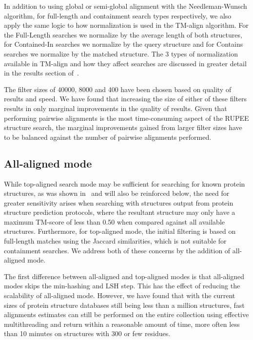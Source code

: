 \documentclass[10pt,letterpaper]{article}
\begin{document}
In addition to using global or semi-global alignment with the Needleman-Wunsch algorithm, for full-length and containment search types respectively, we also apply the same logic to how normalization is used in the TM-align algorithm. 
For the Full-Length searches we normalize by the average length of both structures, for Contained-In searches we normalize by the query structure and for Contains searches we normalize by the matched structure.
The 3 types of normalization available in TM-align and how they affect searches are discussed in greater detail in the results section of~\cite{Ayoub2019}.

The filter sizes of 40000, 8000 and 400 have been chosen based on quality of results and speed. 
We have found that increasing the size of either of these filters results in only marginal improvements in the quality of results. 
Given that performing pairwise alignments is the most time-consuming aspect of the RUPEE structure search, the marginal improvements gained from larger filter sizes have to be balanced against the number of pairwise alignments performed. 

\subsection*{All-aligned mode}

While top-aligned search mode may be sufficient for searching for known protein structures, as was shown in~\cite{Ayoub2019} and will also be reinforced below, the need for greater sensitivity arises when searching with structures output from protein structure prediction protocols, where the resultant structure may only have a maximum TM-score of less than 0.50 when compared against all available structures.
Furthermore, for top-aligned mode, the initial filtering is based on full-length matches using the Jaccard similarities, which is not suitable for containment searches. We address both of these concerns by the addition of all-aligned mode. 

The first difference between all-aligned and top-aligned modes is that all-aligned modes skips the min-hashing and LSH step. 
This has the effect of reducing the scalability of all-aligned mode. 
However, we have found that with the current sizes of protein structure databases still being less than a million structures, fast alignments estimates can still be performed on the entire collection using effective multithreading and return within a reasonable amount of time, more often less than 10 minutes on structures with 300 or few residues. 
\end{document}
